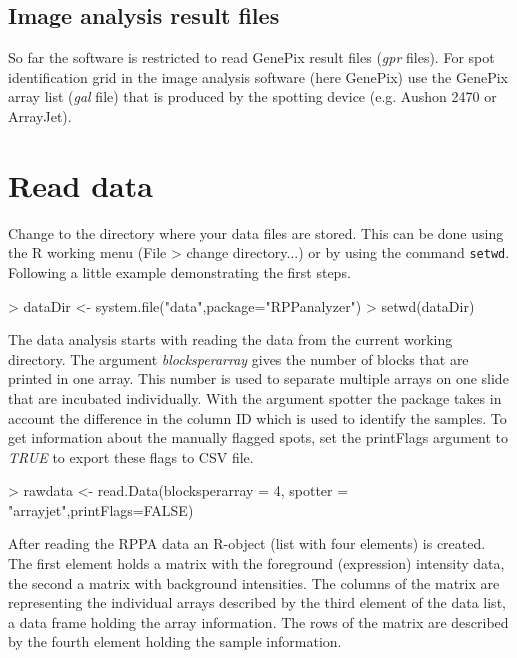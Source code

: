 \documentclass[12pt]{article}
\newcommand{\Rfunction}[1]{{\texttt{#1}}}
\newcommand{\Rfunarg}[1]{{\textit{#1}}}
\begin{document}
\subsection{Image analysis result files}

So far the software is restricted to read GenePix result files (\emph{gpr} files). For spot identification grid in the image analysis software (here\: GenePix) use the GenePix array list (\emph{gal} file) that is produced by the spotting device (e.g. Aushon 2470 or ArrayJet).


\section{Read data}

Change to the directory where your data files are stored. This can be done using
the R working menu (File > change directory...) or by using the command \Rfunction{setwd}. Following a little example demonstrating the first steps.
\begin{Schunk}
\begin{Sinput}
> dataDir <- system.file("data",package="RPPanalyzer")
> setwd(dataDir)
\end{Sinput}
\end{Schunk}

The data analysis starts with reading the data from the current working directory.
The argument \Rfunarg{blocksperarray} gives the number of blocks that are printed in one array.
This number is used to separate multiple arrays on one slide that are incubated individually.
With the argument spotter the package takes in account the difference in the column ID which is
used to identify the samples. To get information about the manually flagged spots, set
the printFlags argument to \Rfunarg{TRUE} to export these flags to CSV file.

\begin{Schunk}
\begin{Sinput}
> rawdata <- read.Data(blocksperarray = 4, spotter = "arrayjet",printFlags=FALSE)
\end{Sinput}
\end{Schunk}

After reading the RPPA data an R-object (list with four elements) is created. The first element
holds a matrix with the foreground (expression) intensity data, the second a matrix with background intensities.
The columns of the matrix are representing the individual arrays described by the
third element of the data list, a data frame holding the array information. The rows of the matrix are described by the fourth element holding the sample information.
\end{document}
